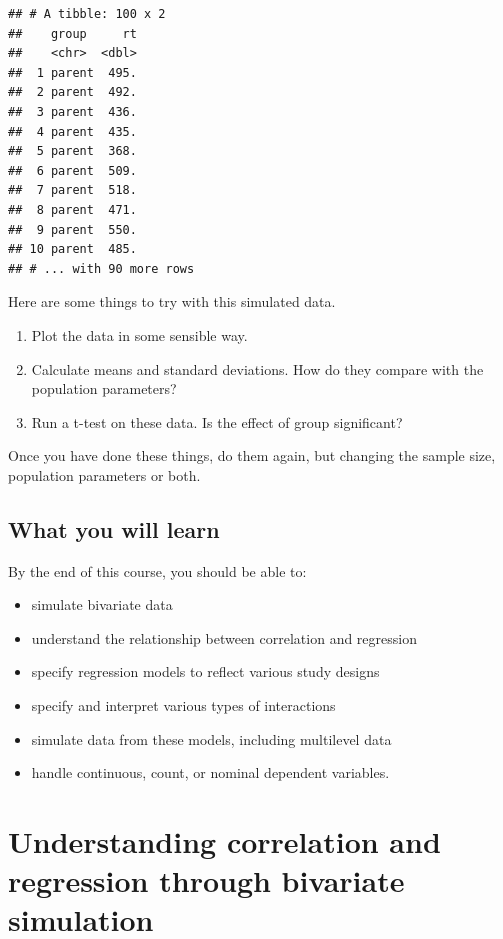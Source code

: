 \documentclass[]{book}
\providecommand{\tightlist}{%
  \setlength{\itemsep}{0pt}\setlength{\parskip}{0pt}}
\begin{document}
\begin{verbatim}
## # A tibble: 100 x 2
##    group     rt
##    <chr>  <dbl>
##  1 parent  495.
##  2 parent  492.
##  3 parent  436.
##  4 parent  435.
##  5 parent  368.
##  6 parent  509.
##  7 parent  518.
##  8 parent  471.
##  9 parent  550.
## 10 parent  485.
## # ... with 90 more rows
\end{verbatim}

Here are some things to try with this simulated data.

\begin{enumerate}
\def\labelenumi{\arabic{enumi}.}
\tightlist
\item
  Plot the data in some sensible way.
\item
  Calculate means and standard deviations. How do they compare with the population parameters?
\item
  Run a t-test on these data. Is the effect of group significant?
\end{enumerate}

Once you have done these things, do them again, but changing the sample size, population parameters or both.

\hypertarget{what-you-will-learn}{%
\section{What you will learn}\label{what-you-will-learn}}

By the end of this course, you should be able to:

\begin{itemize}
\tightlist
\item
  simulate bivariate data
\item
  understand the relationship between correlation and regression
\item
  specify regression models to reflect various study designs
\item
  specify and interpret various types of interactions
\item
  simulate data from these models, including multilevel data
\item
  handle continuous, count, or nominal dependent variables.
\end{itemize}

\hypertarget{understanding-correlation-and-regression-through-bivariate-simulation}{%
\chapter{Understanding correlation and regression through bivariate simulation}\label{understanding-correlation-and-regression-through-bivariate-simulation}}
\end{document}
